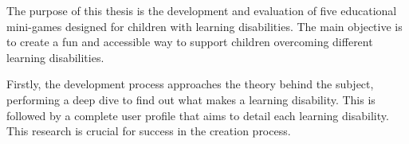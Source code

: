 



The purpose of this thesis is the development and evaluation of five educational mini-games designed for children with learning disabilities. The main objective is to create a fun and accessible way to support children overcoming different learning disabilities.

Firstly, the development process approaches the theory behind the subject, performing a deep dive to find out what makes a learning disability. This is followed by a complete user profile that aims to detail each learning disability. This research is crucial for success in the creation process.

